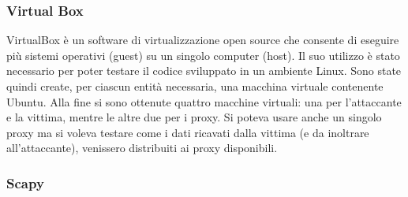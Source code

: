 \subsubsection*{Virtual Box} \label{strumenti:virtualbox}
VirtualBox \cite{virtualbox} è un software di virtualizzazione open source 
che consente di eseguire più sistemi operativi (guest) su un singolo computer (host). 
\vspace{2ex} \newline 
Il suo utilizzo è stato necessario per poter testare il codice sviluppato in un ambiente Linux. 
Sono state quindi create, per ciascun entità necessaria, una macchina virtuale contenente Ubuntu. 
\vspace{1ex} \newline
Alla fine si sono ottenute quattro macchine virtuali: una per l'attaccante 
e la vittima, mentre le altre due per i proxy. 
Si poteva usare anche un singolo proxy ma si voleva testare come i 
dati ricavati dalla vittima (e da inoltrare all'attaccante), 
venissero distribuiti ai proxy disponibili.  

\subsubsection*{Scapy} \label{strumenti:scapy}

